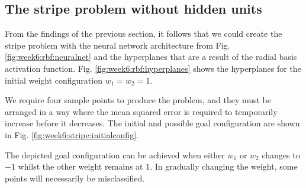 \documentclass{article}
\begin{document}
\subsection{The stripe problem without hidden units}
From the findings of the previous section, it follows that we could create the stripe problem with the neural network architecture from Fig. \ref{fig:week6:rbf:neuralnet} and the hyperplanes that are a result of the radial basis activation function.
Fig. \ref{fig:week6:rbf:hyperplanes} shows the hyperplanes for the initial weight configuration $w_1=w_2=1$.

We require four sample points to produce the problem, and they must be arranged in a way where the mean squared error is required to temporarily increase before it decreases.
The initial and possible goal configuration are shown in Fig. \ref{fig:week6:stripe:initialconfig}.

The depicted goal configuration can be achieved when either $w_1$ or $w_2$ changes to $-1$ whilst the other weight remains at $1$. In gradually changing the weight, some points will necessarily be misclassified. 
\end{document}
